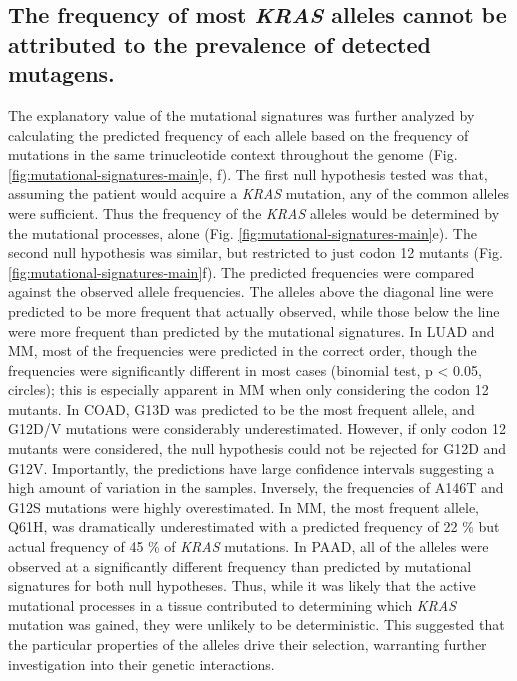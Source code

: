 \documentclass[english, 12pt, letterpaper]{article}
\newcommand{\KRAS}{\emph{KRAS}}
\begin{document}
\subsection*{The frequency of most \KRAS{} alleles cannot be attributed to the prevalence of detected mutagens.}

The explanatory value of the mutational signatures was further analyzed by calculating the predicted frequency of each allele based on the frequency of mutations in the same trinucleotide context throughout the genome (Fig. \ref{fig:mutational-signatures-main}e, f).
The first null hypothesis tested was that, assuming the patient would acquire a \KRAS{} mutation, any of the common alleles were sufficient. Thus the frequency of the \KRAS{} alleles would be determined by the mutational processes, alone (Fig. \ref{fig:mutational-signatures-main}e).
The second null hypothesis was similar, but restricted to just codon 12 mutants (Fig. \ref{fig:mutational-signatures-main}f).
The predicted frequencies were compared against the observed allele frequencies.
The alleles above the diagonal line were predicted to be more frequent that actually observed, while those below the line were more frequent than predicted by the mutational signatures.
In LUAD and MM, most of the frequencies were predicted in the correct order, though the frequencies were significantly different in most cases (binomial test, p < 0.05, circles); this is especially apparent in MM when only considering the codon 12 mutants.
In COAD, G13D was predicted to be the most frequent allele, and G12D/V mutations were considerably underestimated.
However, if only codon 12 mutants were considered, the null hypothesis could not be rejected for G12D and G12V.
Importantly, the predictions have large confidence intervals suggesting a high amount of variation in the samples.
Inversely, the frequencies of A146T and G12S mutations were highly overestimated.
In MM, the most frequent allele, Q61H, was dramatically underestimated with a predicted frequency of 22 \% but actual frequency of 45 \% of \KRAS{} mutations.
In PAAD, all of the alleles were observed at a significantly different frequency than predicted by mutational signatures for both null hypotheses.
Thus, while it was likely that the active mutational processes in a tissue contributed to determining which \KRAS{} mutation was gained, they were unlikely to be deterministic.
This suggested that the particular properties of the alleles drive their selection, warranting further investigation into their genetic interactions.
\end{document}
